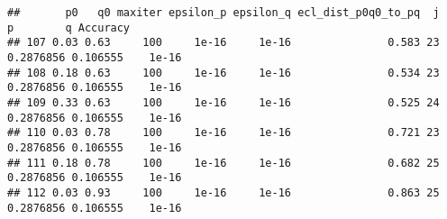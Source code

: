 \documentclass[]{article}
\begin{document}
\begin{verbatim}
##       p0   q0 maxiter epsilon_p epsilon_q ecl_dist_p0q0_to_pq  j         p        q Accuracy
## 107 0.03 0.63     100     1e-16     1e-16               0.583 23 0.2876856 0.106555    1e-16
## 108 0.18 0.63     100     1e-16     1e-16               0.534 23 0.2876856 0.106555    1e-16
## 109 0.33 0.63     100     1e-16     1e-16               0.525 24 0.2876856 0.106555    1e-16
## 110 0.03 0.78     100     1e-16     1e-16               0.721 23 0.2876856 0.106555    1e-16
## 111 0.18 0.78     100     1e-16     1e-16               0.682 25 0.2876856 0.106555    1e-16
## 112 0.03 0.93     100     1e-16     1e-16               0.863 25 0.2876856 0.106555    1e-16
\end{verbatim}
\end{document}
